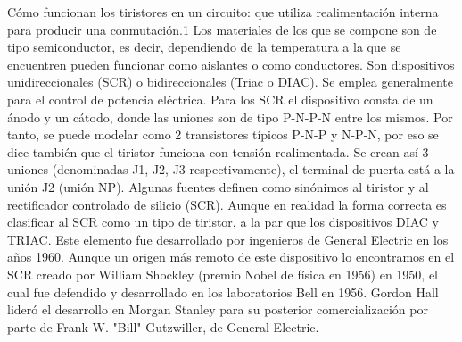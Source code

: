 \documentclass[12pt,a4paper]{article}
\begin{document}
\begin{flushleft}
Cómo funcionan los tiristores en un circuito:
 que utiliza realimentación interna para producir una conmutación.1 Los materiales de los que se compone son de tipo semiconductor, es decir, dependiendo de la temperatura a la que se encuentren pueden funcionar como aislantes o como conductores. Son dispositivos unidireccionales (SCR) o bidireccionales (Triac o DIAC). Se emplea generalmente para el control de potencia eléctrica.
Para los SCR el dispositivo consta de un ánodo y un cátodo, donde las uniones son de tipo P-N-P-N entre los mismos. Por tanto, se puede modelar como 2 transistores típicos P-N-P y N-P-N, por eso se dice también que el tiristor funciona con tensión realimentada. Se crean así 3 uniones (denominadas J1, J2, J3 respectivamente), el terminal de puerta está a la unión J2 (unión NP).
Algunas fuentes definen como sinónimos al tiristor y al rectificador controlado de silicio (SCR). Aunque en realidad la forma correcta es clasificar al SCR como un tipo de tiristor, a la par que los dispositivos DIAC y TRIAC.
Este elemento fue desarrollado por ingenieros de General Electric en los años 1960. Aunque un origen más remoto de este dispositivo lo encontramos en el SCR creado por William Shockley (premio Nobel de física en 1956) en 1950, el cual fue defendido y desarrollado en los laboratorios Bell en 1956. Gordon Hall lideró el desarrollo en Morgan Stanley para su posterior comercialización por parte de Frank W. "Bill" Gutzwiller, de General Electric.

\end{flushleft}
\end{document}
